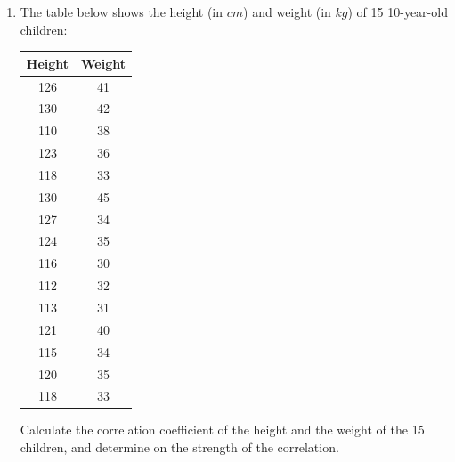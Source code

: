 \documentclass{report}
\begin{document}
\begin{multicols}{2}
  \begin{enumerate}
    \item The table below shows the height (in $cm$) and weight (in $kg$) of 15
          10-year-old children:
          \begin{center}
            \begin{tabular}{|c|c|}
              \hline
              Height & Weight \\
              \hline
              126    & 41     \\
              130    & 42     \\
              110    & 38     \\
              123    & 36     \\
              118    & 33     \\
              130    & 45     \\
              127    & 34     \\
              124    & 35     \\
              116    & 30     \\
              112    & 32     \\
              113    & 31     \\
              121    & 40     \\
              115    & 34     \\
              120    & 35     \\
              118    & 33     \\
              \hline
            \end{tabular}
          \end{center}
          Calculate the correlation coefficient of the height and the weight of the 15 children, and determine on the strength of the correlation.
          \sol{}
          \begin{center}
\end{center}
\end{enumerate}
\end{multicols}
\end{document}
